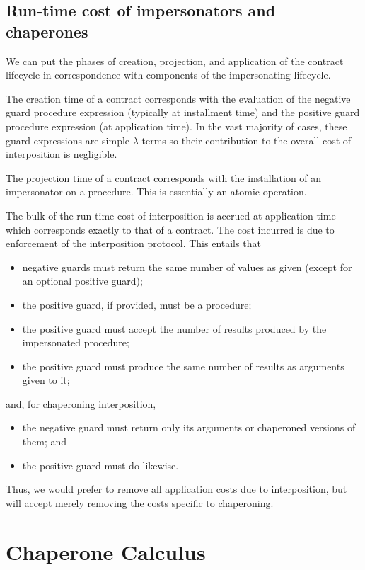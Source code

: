 \documentclass{sigplanconf}
\begin{document}
\subsection{Run-time cost of impersonators and chaperones}

We can put the phases of creation, projection, and application of the contract lifecycle in correspondence with components of the impersonating lifecycle.

The creation time of a contract corresponds with the evaluation of the negative guard procedure expression (typically at installment time) and the positive guard procedure expression (at application time).
In the vast majority of cases, these guard expressions are simple $\lambda$-terms so their contribution to the overall cost of interposition is negligible.

The projection time of a contract corresponds with the installation of an impersonator on a procedure.
This is essentially an atomic operation.

The bulk of the run-time cost of interposition is accrued at application time which corresponds exactly to that of a contract.
The cost incurred is due to enforcement of the interposition protocol.
This entails that
\begin{itemize}
\item negative guards must return the same number of values as given (except for an optional positive guard);
\item the positive guard, if provided, must be a procedure;
\item the positive guard must accept the number of results produced by the impersonated procedure;
\item the positive guard must produce the same number of results as arguments given to it;
\end{itemize}
and, for chaperoning interposition,
\begin{itemize}
\item the negative guard must return only its arguments or chaperoned versions of them; and
\item the positive guard must do likewise.
\end{itemize}

Thus, we would prefer to remove all application costs due to interposition, but will accept merely removing the costs specific to chaperoning.

\section{Chaperone Calculus}
\end{document}
